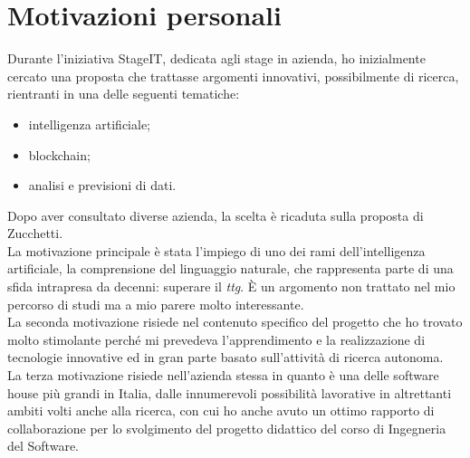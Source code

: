 \section{Motivazioni personali}
Durante l'iniziativa StageIT, dedicata agli stage in azienda, ho inizialmente cercato una proposta che trattasse argomenti innovativi, possibilmente di ricerca, rientranti in una delle seguenti tematiche:
\begin{itemize}
	\item intelligenza artificiale;
	\item blockchain;
	\item analisi e previsioni di dati.
\end{itemize}
Dopo aver consultato diverse azienda, la scelta è ricaduta sulla proposta di Zucchetti. \\
La motivazione principale è stata l'impiego di uno dei rami dell'intelligenza artificiale, la comprensione del linguaggio naturale, che rappresenta parte di una sfida intrapresa da decenni: superare il \emph{\gls{ttg}}\glsfirstoccur. È un argomento non trattato nel mio percorso di studi ma a mio parere molto interessante. \\
La seconda motivazione risiede nel contenuto specifico del progetto che ho trovato molto stimolante perché mi prevedeva l'apprendimento e la realizzazione di tecnologie innovative ed in gran parte basato sull'attività di ricerca autonoma. \\
La terza motivazione risiede nell'azienda stessa in quanto è una delle software house più grandi in Italia, dalle innumerevoli possibilità lavorative in altrettanti ambiti volti anche alla ricerca, con cui ho anche avuto un ottimo rapporto di collaborazione per lo svolgimento del progetto didattico del corso di Ingegneria del Software.